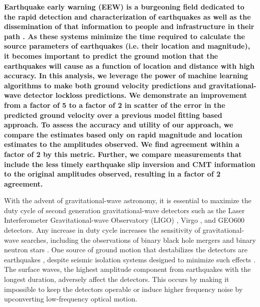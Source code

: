 \documentclass[preprint, aps, showpacs]{revtex4-1}
\begin{document}
\author{Hugh Radkins}

\author{Bas Swinkels}

\author{Keith Thorne}

\author{Jim Warner}

\maketitle

\textbf{Earthquake early warning (EEW) is a burgeoning field dedicated to the rapid detection and characterization of earthquakes as well as the dissemination of that information to people and infrastructure in their path \cite{Al2012,KuAl2013a,KuAl2013b,KuHe2014,CoLa2009a,CoLa2009b,BoAl2014,HoKa2008,HoEA2011c,StAl2016}.
As these systems minimize the time required to calculate the source parameters of earthquakes (i.e. their location and magnitude), it becomes important to predict the ground motion that the earthquakes will cause as a function of location and distance with high accuracy.
In this analysis, we leverage the power of machine learning algorithms to make both ground velocity predictions and gravitational-wave detector lockloss predictions. We demonstrate an improvement from a factor of 5 to a factor of 2 in scatter of the error in the predicted ground velocity over a previous model fitting based approach.
To assess the accuracy and utility of our approach, we compare the estimates based only on rapid magnitude and location estimates to the amplitudes observed.
We find agreement within a factor of 2 by this metric.
Further, we compare measurements that include the less timely earthquake slip inversion and CMT information to the original amplitudes observed, resulting in a factor of 2 agreement.}

With the advent of gravitational-wave astronomy, it is essential to maximize the duty cycle of second generation gravitational-wave detectors such as the Laser Interferometer Gravitational-wave Observatory (LIGO) \cite{aligo}, Virgo \cite{avirgo}, and GEO600 \cite{Gr2010} detectors.
Any increase in duty cycle increases the sensitivity of gravitational-wave searches, including the observations of binary black hole mergers \cite{AbEA2016a,AbEA2016e,AbEA2017a,AbEA2017c} and binary neutron stars \cite{AbEA2017b}.
One source of ground motion that destabilizes the detectors are earthquakes
\cite{CoSt2015,CoEa2017}, despite seismic isolation systems designed to minimize such effects \cite{AbAd2002,StAb2009,MaLa2015}.
The surface waves, the highest amplitude component from earthquakes with the longest duration, adversely affect the detectors. 
This occurs by making it impossible to keep the detectors operable or induce higher frequency noise by upconverting low-frequency optical motion.
\end{document}
